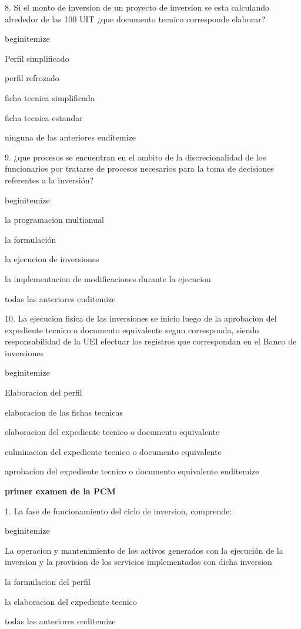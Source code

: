 8. Si el monto de inversion de un proyecto de inversion se esta calculando alrededor de las 100 UIT ¿que documento tecnico corresponde elaborar? 

begin{itemize}
			\item Perfil simplificado
 			\item perfil refrozado
			\item ficha tecnica simplificada
			\item ficha tecnica estandar
			\item ninguna de las anteriores 
end{itemize}

9. ¿que procesos se encuentran en el ambito de la discrecionalidad de los funcionarios por tratarse de procesos necesarios para la toma de decisiones referentes a la inversión?

begin{itemize}
			\item la programacion multianual
 			\item la formulación 
			\item la ejecucion de inversiones 
			\item la implementacion de modificaciones durante la ejecucion
			\item todas las anteriores
end{itemize}

10. La ejecucion fisica de las inversiones se inicio luego de la aprobacion del expediente tecnico o documento equivalente segun corresponda, siendo responsabilidad de la UEI efectuar los registros que correspondan en el Banco de inversiones 

begin{itemize}
			\item Elaboracion del perfil
 			\item elaboracion de las fichas tecnicas
			\item elaboracion del expediente tecnico o documento equivalente 
			\item culminacion del expediente tecnico o documento equivalente 
			\item aprobacion del expediente tecnico o documento equivalente 
end{itemize}
 

\textbf{primer examen de la PCM}



1. La fase de funcionamiento del ciclo de inversion, comprende:

begin{itemize}
			\item La operacion y mantenimiento de los activos generados con la ejecución de la inversion y la provision de los servicios implementados con dicha inversion 
 			\item la formulacion del perfil
			\item la elaboracion del expediente tecnico 
			\item todas las anteriores
end{itemize}

